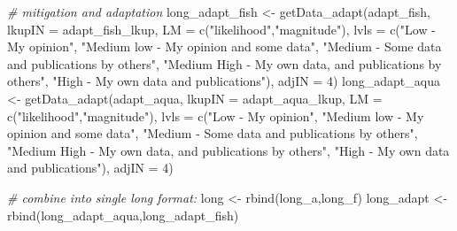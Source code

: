 \documentclass[
]{article}
\newenvironment{Shaded}{\begin{snugshade}}{\end{snugshade}}
\newcommand{\AttributeTok}[1]{\textcolor[rgb]{0.77,0.63,0.00}{#1}}
\newcommand{\CommentTok}[1]{\textcolor[rgb]{0.56,0.35,0.01}{\textit{#1}}}
\newcommand{\DecValTok}[1]{\textcolor[rgb]{0.00,0.00,0.81}{#1}}
\newcommand{\FunctionTok}[1]{\textcolor[rgb]{0.00,0.00,0.00}{#1}}
\newcommand{\NormalTok}[1]{#1}
\newcommand{\OtherTok}[1]{\textcolor[rgb]{0.56,0.35,0.01}{#1}}
\newcommand{\StringTok}[1]{\textcolor[rgb]{0.31,0.60,0.02}{#1}}
\begin{document}
\begin{Shaded}
\begin{Highlighting}[]
    
    \CommentTok{\# mitigation and adaptation}
\NormalTok{    long\_adapt\_fish   }\OtherTok{\textless{}{-}} \FunctionTok{getData\_adapt}\NormalTok{(adapt\_fish,}
                                       \AttributeTok{lkupIN =}\NormalTok{ adapt\_fish\_lkup,}
                                       \AttributeTok{LM  =} \FunctionTok{c}\NormalTok{(}\StringTok{"likelihood"}\NormalTok{,}\StringTok{"magnitude"}\NormalTok{),}
                                       \AttributeTok{lvls  =} \FunctionTok{c}\NormalTok{(}\StringTok{"Low  {-} My opinion"}\NormalTok{,}
                                                  \StringTok{"Medium low {-} My opinion and some data"}\NormalTok{,}
                                                  \StringTok{"Medium {-} Some data and publications by others"}\NormalTok{,}
                                                  \StringTok{"Medium High {-} My own data, and publications by others"}\NormalTok{,}
                                                  \StringTok{"High {-} My own data and publications"}\NormalTok{),}
                                       \AttributeTok{adjIN =} \DecValTok{4}\NormalTok{)}
\NormalTok{    long\_adapt\_aqua   }\OtherTok{\textless{}{-}} \FunctionTok{getData\_adapt}\NormalTok{(adapt\_aqua,}
                                       \AttributeTok{lkupIN =}\NormalTok{ adapt\_aqua\_lkup,}
                                       \AttributeTok{LM  =} \FunctionTok{c}\NormalTok{(}\StringTok{"likelihood"}\NormalTok{,}\StringTok{"magnitude"}\NormalTok{),}
                                       \AttributeTok{lvls  =} \FunctionTok{c}\NormalTok{(}\StringTok{"Low  {-} My opinion"}\NormalTok{,}
                                                  \StringTok{"Medium low {-} My opinion and some data"}\NormalTok{,}
                                                  \StringTok{"Medium {-} Some data and publications by others"}\NormalTok{,}
                                                  \StringTok{"Medium High {-} My own data, and publications by others"}\NormalTok{,}
                                                  \StringTok{"High {-} My own data and publications"}\NormalTok{),}
                                       \AttributeTok{adjIN =} \DecValTok{4}\NormalTok{)}
    
     \CommentTok{\# combine into single long format:}
\NormalTok{    long       }\OtherTok{\textless{}{-}} \FunctionTok{rbind}\NormalTok{(long\_a,long\_f)}
\NormalTok{    long\_adapt }\OtherTok{\textless{}{-}} \FunctionTok{rbind}\NormalTok{(long\_adapt\_aqua,long\_adapt\_fish)}
    

\end{Highlighting}
\end{Shaded}
\end{document}
